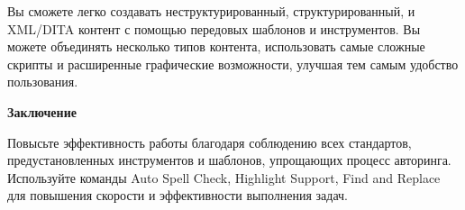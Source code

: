 \documentclass[a4paper,12pt]{article} %
\begin{document}
         Вы сможете легко создавать неструктурированный, структурированный, и XML/DITA контент с помощью передовых шаблонов и инструментов. Вы можете объединять несколько типов контента, использовать самые сложные скрипты и расширенные графические возможности, улучшая тем самым удобство пользования.


\newpage

\begin{center}
\huge \textbf{Заключение}

\end{center}

\normalsize

           Повысьте эффективность работы благодаря соблюдению всех стандартов, предустановленных инструментов и шаблонов, упрощающих процесс авторинга. Используйте команды Auto Spell Check, Highlight Support, Find and Replace для повышения скорости и эффективности выполнения задач.

\newpage
\end{document}
